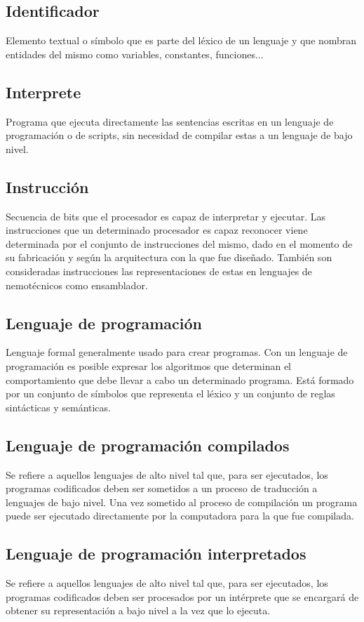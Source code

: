 \subsection{Identificador}
Elemento textual o símbolo que es parte del léxico de un lenguaje y que nombran entidades del mismo como variables, constantes, funciones...

\subsection{Interprete}
Programa que ejecuta directamente las sentencias escritas en un lenguaje de programación o de scripts, sin necesidad de compilar estas a un lenguaje de 
bajo nivel. 

\subsection{Instrucción}
Secuencia de bits que el procesador es capaz de interpretar y ejecutar. Las instrucciones que un determinado procesador es capaz reconocer 
viene determinada por el conjunto de instrucciones del mismo, dado en el momento de su fabricación y según la arquitectura con la que fue diseñado. 
También son consideradas instrucciones las representaciones de estas en lenguajes de nemotécnicos como ensamblador.

\subsection{Lenguaje de programación}
Lenguaje formal generalmente usado para crear programas. Con un lenguaje de programación es posible expresar los 
algoritmos que determinan el comportamiento que debe llevar a cabo un determinado programa. Está formado por
un conjunto de símbolos que representa el léxico y un conjunto de reglas sintácticas y semánticas. 

\subsection{Lenguaje de programación compilados}
Se refiere a aquellos lenguajes de alto nivel tal que, para ser ejecutados, los programas codificados deben ser sometidos a un proceso 
de traducción a lenguajes de bajo nivel. Una vez sometido al proceso de compilación un programa puede ser ejecutado directamente por 
la computadora para la que fue compilada.  

\subsection{Lenguaje de programación interpretados}
Se refiere a aquellos lenguajes de alto nivel tal que, para ser ejecutados, los programas codificados deben ser procesados por un intérprete que 
se encargará de obtener su representación a bajo nivel a la vez que lo ejecuta.

